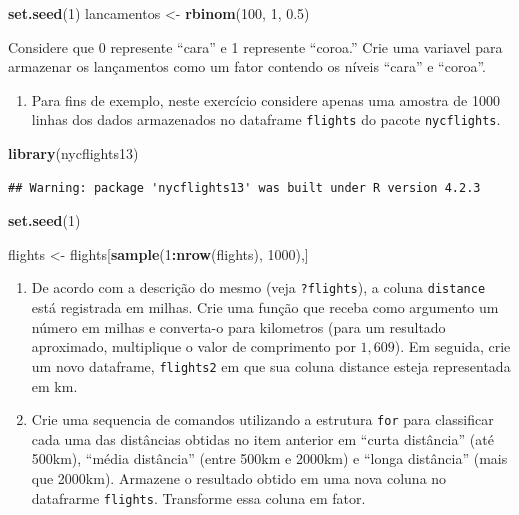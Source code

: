 \documentclass[
]{book}
\newenvironment{Shaded}{\begin{snugshade}}{\end{snugshade}}
\newcommand{\DecValTok}[1]{\textcolor[rgb]{0.00,0.00,0.81}{#1}}
\newcommand{\FloatTok}[1]{\textcolor[rgb]{0.00,0.00,0.81}{#1}}
\newcommand{\FunctionTok}[1]{\textcolor[rgb]{0.13,0.29,0.53}{\textbf{#1}}}
\newcommand{\NormalTok}[1]{#1}
\newcommand{\OtherTok}[1]{\textcolor[rgb]{0.56,0.35,0.01}{#1}}
\newcommand{\SpecialCharTok}[1]{\textcolor[rgb]{0.81,0.36,0.00}{\textbf{#1}}}
\providecommand{\tightlist}{%
  \setlength{\itemsep}{0pt}\setlength{\parskip}{0pt}}
\begin{document}
\begin{Shaded}
\begin{Highlighting}[]
\FunctionTok{set.seed}\NormalTok{(}\DecValTok{1}\NormalTok{)}
\NormalTok{lancamentos }\OtherTok{\textless{}{-}} \FunctionTok{rbinom}\NormalTok{(}\DecValTok{100}\NormalTok{, }\DecValTok{1}\NormalTok{, }\FloatTok{0.5}\NormalTok{)}
\end{Highlighting}
\end{Shaded}

Considere que 0 represente ``cara'' e 1 represente ``coroa.'' Crie uma variavel para armazenar os lançamentos como um fator contendo os níveis ``cara'' e ``coroa''.

\begin{enumerate}
\def\labelenumi{\arabic{enumi}.}
\setcounter{enumi}{1}
\tightlist
\item
  Para fins de exemplo, neste exercício considere apenas uma amostra de 1000 linhas dos dados armazenados no dataframe \texttt{flights} do pacote \texttt{nycflights}.
\end{enumerate}

\begin{Shaded}
\begin{Highlighting}[]
\FunctionTok{library}\NormalTok{(nycflights13)}
\end{Highlighting}
\end{Shaded}

\begin{verbatim}
## Warning: package 'nycflights13' was built under R version 4.2.3
\end{verbatim}

\begin{Shaded}
\begin{Highlighting}[]
\FunctionTok{set.seed}\NormalTok{(}\DecValTok{1}\NormalTok{)}

\NormalTok{flights }\OtherTok{\textless{}{-}}\NormalTok{ flights[}\FunctionTok{sample}\NormalTok{(}\DecValTok{1}\SpecialCharTok{:}\FunctionTok{nrow}\NormalTok{(flights), }\DecValTok{1000}\NormalTok{),]}
\end{Highlighting}
\end{Shaded}

\begin{enumerate}
\def\labelenumi{\alph{enumi})}
\item
  De acordo com a descrição do mesmo (veja \texttt{?flights}), a coluna \texttt{distance} está registrada em milhas. Crie uma função que receba como argumento um número em milhas e converta-o para kilometros (para um resultado aproximado, multiplique o valor de comprimento por \(1{,}609\)). Em seguida, crie um novo dataframe, \texttt{flights2} em que sua coluna distance esteja representada em km.
\item
  Crie uma sequencia de comandos utilizando a estrutura \texttt{for} para classificar cada uma das distâncias obtidas no item anterior em ``curta distância'' (até 500km), ``média distância'' (entre 500km e 2000km) e ``longa distância'' (mais que 2000km). Armazene o resultado obtido em uma nova coluna no datafrarme \texttt{flights}. Transforme essa coluna em fator.
\end{enumerate}
\end{document}
